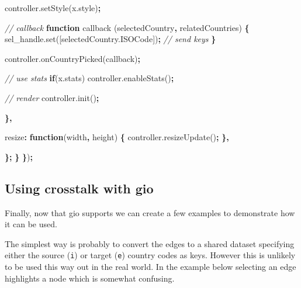 \documentclass[
]{krantz}
\makeatletter
\newenvironment{Shaded}{\begin{snugshade}}{\end{snugshade}}
\newcommand{\AttributeTok}[1]{\textcolor[rgb]{0.61,0.61,0.61}{#1}}
\newcommand{\CommentTok}[1]{\textcolor[rgb]{0.37,0.37,0.37}{\textit{#1}}}
\newcommand{\ControlFlowTok}[1]{\textcolor[rgb]{0.27,0.27,0.27}{\textbf{#1}}}
\newcommand{\DataTypeTok}[1]{\textcolor[rgb]{0.27,0.27,0.27}{#1}}
\newcommand{\KeywordTok}[1]{\textcolor[rgb]{0.27,0.27,0.27}{\textbf{#1}}}
\newcommand{\NormalTok}[1]{#1}
\newcommand{\OperatorTok}[1]{\textcolor[rgb]{0.43,0.43,0.43}{\textbf{#1}}}
\newcommand{\VariableTok}[1]{\textcolor[rgb]{0,0,0}{#1}}
\newenvironment{kframe}{%
\medskip{}
\setlength{\fboxsep}{.8em}
 \def\at@end@of@kframe{}%
 \ifinner\ifhmode%
  \def\at@end@of@kframe{\end{minipage}}%
  \begin{minipage}{\columnwidth}%
 \fi\fi%
 \def\FrameCommand##1{\hskip\@totalleftmargin \hskip-\fboxsep
 \colorbox{shadecolor}{##1}\hskip-\fboxsep
     \hskip-\linewidth \hskip-\@totalleftmargin \hskip\columnwidth}%
 \MakeFramed {\advance\hsize-\width
   \@totalleftmargin\z@ \linewidth\hsize
   \@setminipage}}%
 {\par\unskip\endMakeFramed%
 \at@end@of@kframe}
\renewenvironment{Shaded}{\begin{kframe}}{\end{kframe}}
\makeatother
\begin{document}
\begin{Shaded}
\begin{Highlighting}[]
        \VariableTok{controller}\NormalTok{.}\AttributeTok{setStyle}\NormalTok{(}\VariableTok{x}\NormalTok{.}\AttributeTok{style}\NormalTok{)}\OperatorTok{;}

        \CommentTok{// callback}
        \KeywordTok{function} \AttributeTok{callback}\NormalTok{ (selectedCountry}\OperatorTok{,}\NormalTok{ relatedCountries) }\OperatorTok{\{}
          \VariableTok{sel\_handle}\NormalTok{.}\AttributeTok{set}\NormalTok{([}\VariableTok{selectedCountry}\NormalTok{.}\AttributeTok{ISOCode}\NormalTok{])}\OperatorTok{;} \CommentTok{// send keys}
        \OperatorTok{\}}

        \VariableTok{controller}\NormalTok{.}\AttributeTok{onCountryPicked}\NormalTok{(callback)}\OperatorTok{;}

        \CommentTok{// use stats}
        \ControlFlowTok{if}\NormalTok{(}\VariableTok{x}\NormalTok{.}\AttributeTok{stats}\NormalTok{)}
          \VariableTok{controller}\NormalTok{.}\AttributeTok{enableStats}\NormalTok{()}\OperatorTok{;}

        \CommentTok{// render}
        \VariableTok{controller}\NormalTok{.}\AttributeTok{init}\NormalTok{()}\OperatorTok{;}

      \OperatorTok{\},}

      \DataTypeTok{resize}\OperatorTok{:} \KeywordTok{function}\NormalTok{(width}\OperatorTok{,}\NormalTok{ height) }\OperatorTok{\{}
        \VariableTok{controller}\NormalTok{.}\AttributeTok{resizeUpdate}\NormalTok{()}\OperatorTok{;}
      \OperatorTok{\},}

    \OperatorTok{\};}
  \OperatorTok{\}}
\OperatorTok{\}}\NormalTok{)}\OperatorTok{;}
\end{Highlighting}
\end{Shaded}

\hypertarget{using-crosstalk-with-gio}{%
\subsection{Using crosstalk with gio}\label{using-crosstalk-with-gio}}

Finally, now that gio supports we can create a few examples to demonstrate how it can be used.

The simplest way is probably to convert the edges to a shared dataset specifying either the source (\texttt{i}) or target (\texttt{e}) country codes as keys. However this is unlikely to be used this way out in the real world. In the example below selecting an edge highlights a node which is somewhat confusing.
\end{document}
